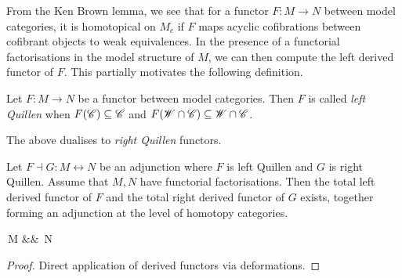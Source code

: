 \documentclass[./main.tex]{subfiles}
\begin{document}
  
\begin{rmk}

  From the Ken Brown lemma,
  we see that for a functor $F : M \to N$ between model categories,
  it is homotopical on $M_c$ if $F$ maps acyclic cofibrations
  between cofibrant objects to weak equivalences.
  In the presence of a functorial factorisations
  in the model structure of $M$,
  we can then compute the left derived functor of $F$.
  This partially motivates the following definition.
\end{rmk}

\begin{dfn}
  
  Let $F : M \to N$ be a functor between model categories.
  Then $F$ is called \emph{left Quillen}
  when $F(\mathscr{C}) \subseteq \mathscr{C}$ and $F(\mathscr{W} \cap \mathscr{C}) \subseteq \mathscr{W} \cap \mathscr{C}$.

  The above dualises to \emph{right Quillen} functors.
\end{dfn}

\begin{prop}
  
  Let $F \dashv G : M \leftrightarrow N$ be an adjunction
  where $F$ is left Quillen and $G$ is right Quillen.
  Assume that $M, N$ have functorial factorisations.
  Then the total left derived functor of $F$ and 
  the total right derived functor of $G$ exists,
  together forming an adjunction at the level of homotopy categories.
  \begin{cd}
    {\,M} && {\,N}
    \arrow["{\mathbf{L} F}", shift left=3, from=1-1, to=1-3]
    \arrow["{\mathbf{R}G}", shift left=3, from=1-3, to=1-1]
    \arrow["\bot"{description}, draw=none, from=1-1, to=1-3]
  \end{cd}
\end{prop}
\begin{proof}
  Direct application of 
  derived functors via deformations.
\end{proof}
\end{document}
